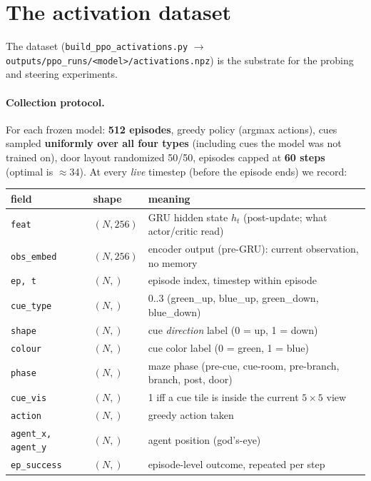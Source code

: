 \documentclass[11pt]{article}
\begin{document}
\section{The activation dataset}
\label{sec:acts}

The dataset (\texttt{build\_ppo\_activations.py} $\rightarrow$
\texttt{outputs/ppo\_runs/<model>/activations.npz}) is the substrate for the probing and steering
experiments.

\paragraph{Collection protocol.} For each frozen model: \textbf{512 episodes}, greedy policy
(argmax actions), cues sampled \textbf{uniformly over all four types} (including cues the model
was not trained on), door layout randomized 50/50, episodes capped at \textbf{60 steps}
(optimal is $\approx$34). At every \emph{live} timestep (before the episode ends) we record:

\begin{center}
\small
\begin{tabular}{lll}
\toprule
field & shape & meaning \\
\midrule
\texttt{feat}       & $(N, 256)$ & GRU hidden state $h_t$ (post-update; what actor/critic read) \\
\texttt{obs\_embed} & $(N, 256)$ & encoder output (pre-GRU): current observation, no memory \\
\texttt{ep, t}      & $(N,)$     & episode index, timestep within episode \\
\texttt{cue\_type}  & $(N,)$     & 0..3 (green\_up, blue\_up, green\_down, blue\_down) \\
\texttt{shape}\footnotemark & $(N,)$ & cue \emph{direction} label (0 = up, 1 = down) \\
\texttt{colour}     & $(N,)$     & cue color label (0 = green, 1 = blue) \\
\texttt{phase}      & $(N,)$     & maze phase (pre-cue, cue-room, pre-branch, branch, post, door) \\
\texttt{cue\_vis}   & $(N,)$     & 1 iff a cue tile is inside the current $5\times5$ view \\
\texttt{action}     & $(N,)$     & greedy action taken \\
\texttt{agent\_x, agent\_y} & $(N,)$ & agent position (god's-eye) \\
\texttt{ep\_success} & $(N,)$    & episode-level outcome, repeated per step \\
\bottomrule
\end{tabular}
\end{center}
\end{document}
